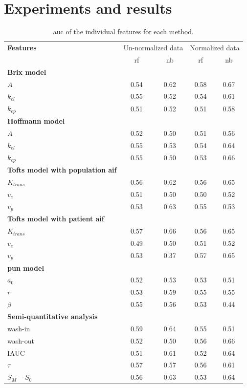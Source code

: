 \section{Experiments and results}\label{sec:experiments}

\begin{table}
  \caption{\acs*{auc} of the individual features for each method.}
  \centering
  \begin{tabular}{l c c c c}
    \toprule
    \textbf{Features} & \multicolumn{2}{c}{Un-normalized data} & \multicolumn{2}{c}{Normalized data} \\
    & \acs*{rf} & \acs*{nb} & \acs*{rf} & \acs*{nb} \\
    \midrule
    \textbf{Brix model} & & & & \\
    \quad $A$         & 0.54 & 0.62 & 0.58 & 0.67 \\
    \quad $k_{el}$    & 0.55 & 0.52 & 0.54 & 0.61 \\
    \quad $k_{ep}$    & 0.51 & 0.52 & 0.51 & 0.58 \\
    \textbf{Hoffmann model} & & & & \\
    \quad $A$         & 0.52 & 0.50 & 0.51 & 0.56 \\
    \quad $k_{el}$    & 0.55 & 0.53 & 0.54 & 0.64 \\
    \quad $k_{ep}$    & 0.55 & 0.50 & 0.53 & 0.66 \\
    \textbf{Tofts model with population \ac{aif}} & & & & \\
    \quad $K_{trans}$ & 0.56 & 0.62 & 0.56 & 0.65 \\
    \quad $v_{e}$     & 0.51 & 0.50 & 0.50 & 0.52 \\
    \quad $v_{p}$     & 0.53 & 0.63 & 0.55 & 0.53 \\
    \textbf{Tofts model with patient \ac{aif}} & & & & \\
    \quad $K_{trans}$ & 0.57 & 0.66 & 0.56 & 0.65 \\
    \quad $v_{e}$     & 0.49 & 0.50 & 0.51 & 0.52 \\
    \quad $v_{p}$     & 0.53 & 0.37 & 0.57 & 0.65 \\
    \textbf{\ac{pun} model} & & & & \\
    \quad $a_0$       & 0.52 & 0.53 & 0.53 & 0.51  \\
    \quad $r$         & 0.53 & 0.59 & 0.55 & 0.55 \\
    \quad $\beta$     & 0.55 & 0.56 & 0.53 & 0.44 \\
    \textbf{Semi-quantitative analysis} & & & & \\
    \quad wash-in     & 0.59 & 0.64 & 0.55 & 0.51 \\
    \quad wash-out    & 0.52 & 0.50 & 0.56 & 0.66 \\
    \quad IAUC        & 0.51 & 0.61 & 0.52 & 0.64 \\
    \quad $\tau$      & 0.57 & 0.57 & 0.56 & 0.61 \\
    \quad $S_M - S_0$ & 0.56 & 0.63 & 0.53 & 0.64 \\
    \bottomrule
  \end{tabular}
  \label{tab:resfeats}
\end{table}

